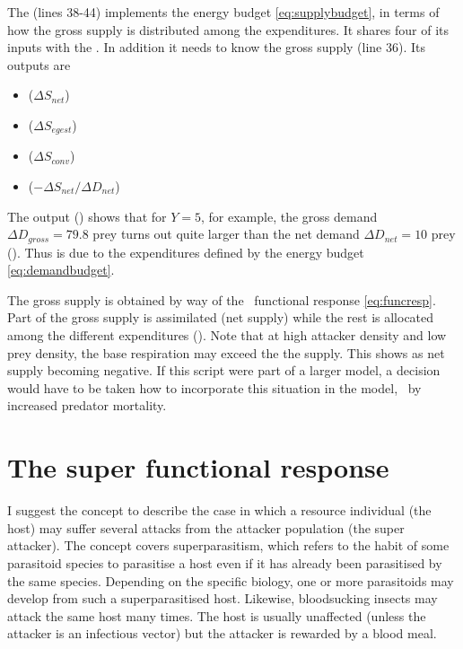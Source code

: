 The  (lines 38-44) implements the energy budget \eqref{eq:supplybudget}, in terms of how the gross supply is distributed among the expenditures. It shares four of its inputs with the . In addition it needs to know the gross supply (line 36). Its outputs are

\begin{itemize}
\item {} ($\Delta S_{net}$)
\item {} ($\Delta S_{egest}$)
\item {} ($\Delta S_{conv}$)
\item {} ($-\Delta S_{net}/\Delta D_{net}$)
\end{itemize}

The output () shows that for $Y=5$, for example, the gross demand $\Delta D_{gross}=79.8$ prey turns out quite larger than the net demand $\Delta D_{net}=10$ prey (). Thus is due to the expenditures defined by the energy budget \eqref{eq:demandbudget}.

The gross supply is obtained by way of the \GB\ functional response \eqref{eq:funcresp}. Part of the gross supply is assimilated (net supply) while the rest is allocated among the different expenditures (). Note that at high attacker density and low prey density, the base respiration may exceed the the supply. This shows as net supply becoming negative. If this script were part of a larger model, a decision would have to be taken how to incorporate this situation in the model, \eg\ by increased predator mortality.

\FloatBarrier
\section{The super functional response}
\label{ch:super-functional-response}
I suggest the concept  to describe the case in which a resource individual (the host) may suffer several attacks from the attacker population (the super attacker). The concept covers superparasitism, which refers to the habit of some parasitoid species to parasitise a host even if it has already been parasitised by the same species. Depending on the specific biology, one or more parasitoids may develop from such a superparasitised host. Likewise, bloodsucking insects may attack the same host many times. The host is usually unaffected (unless the attacker is an infectious vector) but the attacker is rewarded by a blood meal. 

